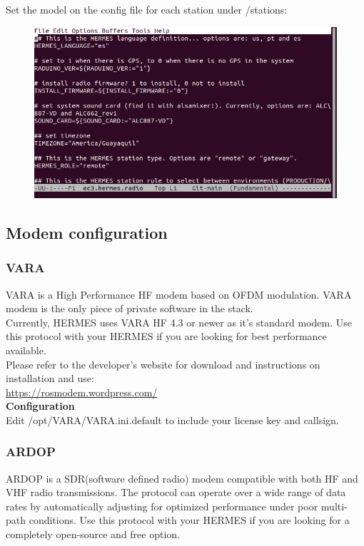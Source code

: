 \documentclass[11pt,a4paper]{article}
\begin{document}
Set the model on the config file for each station under /stations:

\begin{figure}[h!]
  \centering
  \includegraphics[scale=0.45]{screenshots/software_stack/set_system_soundcard.png}
  \label{fig4}
\end{figure}

\subsection{Modem configuration}
\subsubsection{VARA}
VARA is a High Performance HF modem based on OFDM modulation.
VARA modem is the only piece of private software in the stack.\\
Currently, HERMES uses VARA HF 4.3 or newer as it's standard modem.
Use this protocol with your HERMES if you are looking for best performance available.\\

Please refer to the developer's website for download and instructions on installation and use: \\
\url{https://rosmodem.wordpress.com/}\\

\textbf{Configuration}\\
Edit /opt/VARA/VARA.ini.default to include your license key and callsign.

\subsubsection{ARDOP}

ARDOP is a SDR(software defined radio) modem compatible with both HF and VHF radio transmissions.
The protocol can operate over a wide range of data rates by automatically adjusting for optimized performance under poor multi-path conditions.
Use this protocol with your HERMES if you are looking for a completely open-source and free option.
\end{document}

